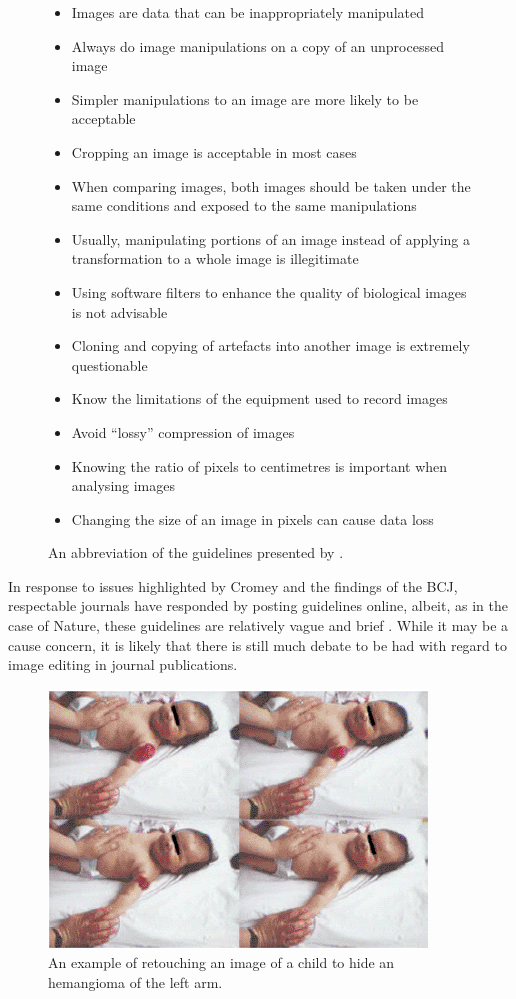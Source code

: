 \documentclass[british,a4paper, 12pt]{article}
\begin{document}
\begin{figure}

\begin{itemize}
\item Images are data that can be inappropriately manipulated
\item Always do image manipulations on a copy of an unprocessed image
\item Simpler manipulations to an image are more likely to be acceptable
\item Cropping an image is acceptable in most cases
\item When comparing images, both images should be taken under the same conditions and exposed to the same manipulations
\item Usually, manipulating portions of an image instead of applying a transformation to a whole image is illegitimate
\item Using software filters to enhance the quality of biological images is not advisable
\item Cloning and copying of artefacts into another image is extremely questionable
\item Know the limitations of the equipment used to record images
\item Avoid ``lossy'' compression of images
\item Knowing the ratio of pixels to centimetres is important when analysing images
\item Changing the size of an image in pixels can cause data loss
\end{itemize}

\caption{An abbreviation of the guidelines presented by \parencite{cromey2001digital}.}
\label{fig:ethicalguidelines}
\end{figure}


In response to issues highlighted by Cromey and the findings of the BCJ, respectable
journals have responded by posting guidelines online, albeit, as in the case of Nature,
these guidelines are relatively vague and brief \parencite{natureimg}. While it may be a
cause concern, it is likely that there is still much debate to be had with regard to image
editing in journal publications.

\begin{figure}
\caption{An example of retouching an image of a child to hide an hemangioma of the left arm.}
\label{fig:cutroneimage}
\includegraphics[natheight=\textheight,natwidth=\textwidth]{images/cutrone2001fig.png}

\end{figure}
\end{document}

